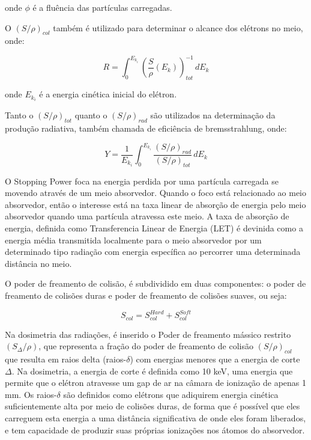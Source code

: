 \documentclass[11pt,a4paper]{article}
\begin{document}
    onde $\phi$ é a fluência das partículas carregadas. 

    O $(S/\rho)_{col}$ também é utilizado para determinar o alcance dos elétrons no meio, onde:

                \begin{equation}
                    R = \int_{0}^{E_{k_i}} \left(\frac{S}{\rho} (E_k)\right)_{tot}^{-1}  \,dE_k 
                \end{equation}

    onde $E_{k_i}$ é a energia cinética inicial do elétron. 

    Tanto o $(S/\rho)_{tot}$ quanto o $(S/\rho)_{rad}$ são utilizados na determinação da produção radiativa, também chamada de eficiência de bremsstrahlung, onde:

                \begin{equation}
                    Y = \frac{1}{E_{k_i}} \int_{0}^{E_{k_i}} \frac{(S/\rho)_{rad}}{(S/\rho)_{tot}} \,dE_k 
                \end{equation}

    O Stopping Power foca na energia perdida por uma partícula carregada se movendo através de um meio absorvedor. Quando o foco está relacionado ao meio absorvedor, então o interesse está na taxa linear de absorção de energia pelo meio absorvedor quando uma partícula atravessa este meio.  A taxa de absorção de energia, definida como Transferencia Linear de Energia (LET) é devinida como a energia média transmitida localmente para o meio absorvedor por um determinado tipo radiação com energia específica ao percorrer uma determinada distância no meio. 

    O poder de freamento de colisão, é subdividido em duas componentes: o poder de freamento de colisões duras e poder de freamento de colisões suaves, ou seja:

                \begin{equation}
                    S_{col} = S_{col}^{Hard} + S_{col}^{Soft}
                \end{equation}

    Na dosimetria das radiações, é inserido o Poder de freamento mássico restrito $(S_\Delta/\rho)$, que representa a fração do poder de freamento de colisão $(S/\rho)_{col}$ que resulta em raios delta (raios-$\delta$) com energias menores que a energia de corte $\Delta$. Na dosimetria, a energia de corte é definida como 10 keV, uma energia que permite que o elétron atravesse um gap de ar na câmara de ionização de apenas 1 mm. Os raios-$\delta$ são definidos como elétrons que adiquirem energia cinética suficientemente alta por meio de colisões duras, de forma que é possível que eles carreguem esta energia a uma distância significativa de onde eles foram liberados, e tem capacidade de produzir suas próprias ionizações nos átomos do absorvedor.
\end{document}
